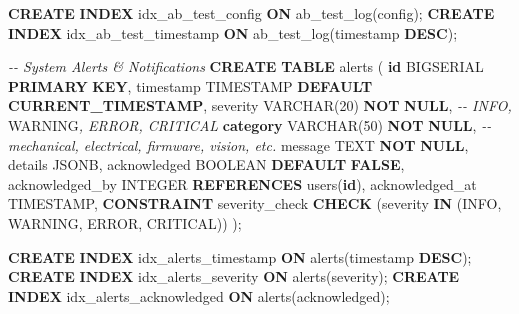 \documentclass[
]{article}
\newenvironment{Shaded}{\begin{snugshade}}{\end{snugshade}}
\newcommand{\AlertTok}[1]{\textcolor[rgb]{0.94,0.16,0.16}{#1}}
\newcommand{\CommentTok}[1]{\textcolor[rgb]{0.56,0.35,0.01}{\textit{#1}}}
\newcommand{\DataTypeTok}[1]{\textcolor[rgb]{0.13,0.29,0.53}{#1}}
\newcommand{\DecValTok}[1]{\textcolor[rgb]{0.00,0.00,0.81}{#1}}
\newcommand{\FunctionTok}[1]{\textcolor[rgb]{0.13,0.29,0.53}{\textbf{#1}}}
\newcommand{\KeywordTok}[1]{\textcolor[rgb]{0.13,0.29,0.53}{\textbf{#1}}}
\newcommand{\NormalTok}[1]{#1}
\newcommand{\StringTok}[1]{\textcolor[rgb]{0.31,0.60,0.02}{#1}}
\begin{document}
\begin{Shaded}
\begin{Highlighting}[]
\KeywordTok{CREATE} \KeywordTok{INDEX}\NormalTok{ idx\_ab\_test\_config }\KeywordTok{ON}\NormalTok{ ab\_test\_log(config);}
\KeywordTok{CREATE} \KeywordTok{INDEX}\NormalTok{ idx\_ab\_test\_timestamp }\KeywordTok{ON}\NormalTok{ ab\_test\_log(}\DataTypeTok{timestamp} \KeywordTok{DESC}\NormalTok{);}

\CommentTok{{-}{-} System Alerts \& Notifications}
\KeywordTok{CREATE} \KeywordTok{TABLE}\NormalTok{ alerts (}
    \KeywordTok{id}\NormalTok{ BIGSERIAL }\KeywordTok{PRIMARY} \KeywordTok{KEY}\NormalTok{,}
    \DataTypeTok{timestamp} \DataTypeTok{TIMESTAMP} \KeywordTok{DEFAULT} \FunctionTok{CURRENT\_TIMESTAMP}\NormalTok{,}
\NormalTok{    severity }\DataTypeTok{VARCHAR}\NormalTok{(}\DecValTok{20}\NormalTok{) }\KeywordTok{NOT} \KeywordTok{NULL}\NormalTok{,  }\CommentTok{{-}{-} INFO, }\AlertTok{WARNING}\CommentTok{, ERROR, CRITICAL}
    \KeywordTok{category} \DataTypeTok{VARCHAR}\NormalTok{(}\DecValTok{50}\NormalTok{) }\KeywordTok{NOT} \KeywordTok{NULL}\NormalTok{,  }\CommentTok{{-}{-} mechanical, electrical, firmware, vision, etc.}
\NormalTok{    message TEXT }\KeywordTok{NOT} \KeywordTok{NULL}\NormalTok{,}
\NormalTok{    details JSONB,}
\NormalTok{    acknowledged }\DataTypeTok{BOOLEAN} \KeywordTok{DEFAULT} \KeywordTok{FALSE}\NormalTok{,}
\NormalTok{    acknowledged\_by }\DataTypeTok{INTEGER} \KeywordTok{REFERENCES}\NormalTok{ users(}\KeywordTok{id}\NormalTok{),}
\NormalTok{    acknowledged\_at }\DataTypeTok{TIMESTAMP}\NormalTok{,}
    \KeywordTok{CONSTRAINT}\NormalTok{ severity\_check }\KeywordTok{CHECK}\NormalTok{ (severity }\KeywordTok{IN}\NormalTok{ (}\StringTok{\textquotesingle{}INFO\textquotesingle{}}\NormalTok{, }\StringTok{\textquotesingle{}WARNING\textquotesingle{}}\NormalTok{, }\StringTok{\textquotesingle{}ERROR\textquotesingle{}}\NormalTok{, }\StringTok{\textquotesingle{}CRITICAL\textquotesingle{}}\NormalTok{))}
\NormalTok{);}

\KeywordTok{CREATE} \KeywordTok{INDEX}\NormalTok{ idx\_alerts\_timestamp }\KeywordTok{ON}\NormalTok{ alerts(}\DataTypeTok{timestamp} \KeywordTok{DESC}\NormalTok{);}
\KeywordTok{CREATE} \KeywordTok{INDEX}\NormalTok{ idx\_alerts\_severity }\KeywordTok{ON}\NormalTok{ alerts(severity);}
\KeywordTok{CREATE} \KeywordTok{INDEX}\NormalTok{ idx\_alerts\_acknowledged }\KeywordTok{ON}\NormalTok{ alerts(acknowledged);}


\end{Highlighting}
\end{Shaded}
\end{document}
